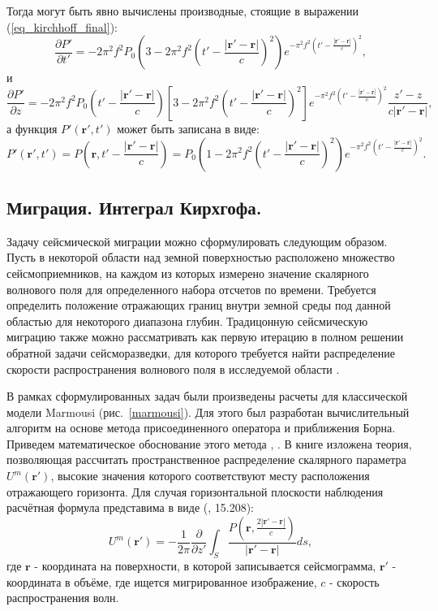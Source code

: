 \documentclass{article}
\newcommand  {\figref  } [1]     {рис.~\ref{#1}}
\newcommand  {\figrefp } [1]     {(\figref{#1})}
\renewcommand{\vec     } [1]     { \bm{#1}           }
\begin{document}
Тогда могут быть явно вычислены производные, стоящие в выражении (\ref{eq_kirchhoff_final}):
\begin{equation}
\label{eq_dp'_dt'}
\frac{\partial P'}{\partial t'} = -2\pi^2f^2P_0(3-2 \pi^2f^2(t' - \frac{|\vec{r'} - \vec{r}|}{c})^2)e^{-\pi^2f^2(t' - \frac{|\vec{r'} - \vec{r}|}{c})^2},
\end{equation}
и
\begin{equation}
\label{eq_dp'_dz}
\frac{\partial P'}{\partial z} = -2\pi^2f^2P_0(t' - \frac{|\vec{r'} - \vec{r}|}{c})[3-2 \pi^2f^2(t' - \frac{|\vec{r'} - \vec{r}|}{c})^2]e^{-\pi^2f^2(t' - \frac{|\vec{r'} - \vec{r}|}{c})^2}
\frac{z'-z}{c|\vec{r'}-\vec{r}|},
\end{equation}
а функция $P'(\vec{r'}, t')$ может быть записана в виде:
\begin{equation}
\label{eq_surface_pressure}
P'(\vec{r'}, t') = P(\vec{r}, t' - \frac{|\vec{r'} - \vec{r}|}{c}) = P_0(1-2 \pi^2f^2(t' - \frac{|\vec{r'} - \vec{r}|}{c})^2)e^{-\pi^2f^2(t'-\frac{|\vec{r'} - \vec{r}|}{c})^2}.
\end{equation}

\subsection{Миграция. Интеграл Кирхгофа.}

	Задачу сейсмической миграции можно сформулировать следующим образом. Пусть в некоторой области над земной поверхностью расположено множество сейсмоприемников, на каждом из которых измерено значение скалярного волнового поля для определенного набора отсчетов по времени. Требуется определить положение отражающих границ внутри земной среды под данной областью для некоторого диапазона глубин. Традицонную сейсмическую миграцию также можно рассматривать как первую итерацию в полном решении обратной задачи сейсморазведки, для которого требуется найти распределение скорости распространения волнового поля в исследуемой области \cite{tarantola2005}.

В рамках сформулированных задач были произведены расчеты для классической модели Marmousi \figrefp{marmousi}. Для этого был разработан вычислительный алгоритм на основе метода присоединенного оператора и приближения Борна. Приведем математическое обоснование этого метода \cite{Zhdanov_2007},\; \cite{claerbout2004}.
В книге \cite{Zhdanov_2007} изложена теория, позволяющая рассчитать пространственное распределение скалярного параметра $U^m(\vec{r'})$, высокие значения которого соответствуют
месту расположения отражающего горизонта.
Для случая горизонтальной плоскости наблюдения расчётная формула представима в виде (\cite{Zhdanov_2007}, 15.208):
\begin{equation}
\label{rayleigh_migration}
U^m(\vec{r'}) = -\frac{1}{2\pi}\frac{\partial}{\partial z'}
	\int_S \frac{P(\vec{r},\frac{2|\vec{r'}-\vec{r}|}{c})}{|\vec{r'}-\vec{r}|}ds,
\end{equation}
где $\vec{r}$ - координата на поверхности, в которой записывается сейсмограмма, $\vec{r'}$ - координата в объёме, где ищется мигрированное изображение, $c$ - скорость распространения волн.
\end{document}

